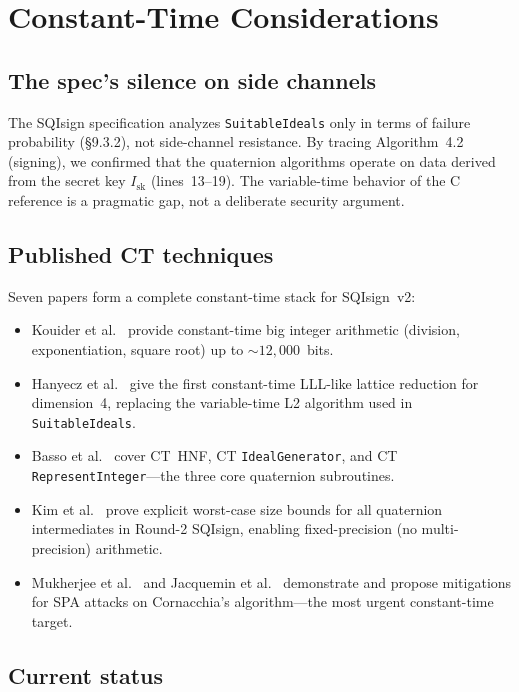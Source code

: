 \section{Constant-Time Considerations}
\label{sec:ct}

\subsection{The spec's silence on side channels}

The SQIsign specification analyzes \texttt{SuitableIdeals} only in
terms of failure probability (\S9.3.2), not side-channel resistance.
By tracing Algorithm~4.2 (signing), we confirmed that the quaternion
algorithms operate on data derived from the secret key
$I_{\mathrm{sk}}$ (lines~13--19).  The variable-time behavior of the
C reference is a pragmatic gap, not a deliberate security argument.

\subsection{Published CT techniques}

Seven papers form a complete constant-time stack for SQIsign~v2:
\begin{itemize}
  \item Kouider et al.~\cite{EPRINT:KMJK25} provide constant-time big
    integer arithmetic (division, exponentiation, square root) up to
    ${\sim}12{,}000$~bits.
  \item Hanyecz et al.~\cite{EPRINT:HKKKS25} give the first constant-time
    LLL-like lattice reduction for dimension~4, replacing the
    variable-time L2 algorithm used in \texttt{SuitableIdeals}.
  \item Basso et al.~\cite{basso2025} cover CT~HNF, CT
    \texttt{IdealGenerator}, and CT \texttt{RepresentInteger}---the
    three core quaternion subroutines.
  \item Kim et al.~\cite{EPRINT:KLKL25} prove explicit worst-case size
    bounds for all quaternion intermediates in Round-2 SQIsign,
    enabling fixed-precision (no multi-precision) arithmetic.
  \item Mukherjee et al.~\cite{EPRINT:MCJKR25} and Jacquemin et
    al.~\cite{EPRINT:JMKR23} demonstrate and propose mitigations for
    SPA attacks on Cornacchia's algorithm---the most urgent
    constant-time target.
\end{itemize}

\subsection{Current status}

